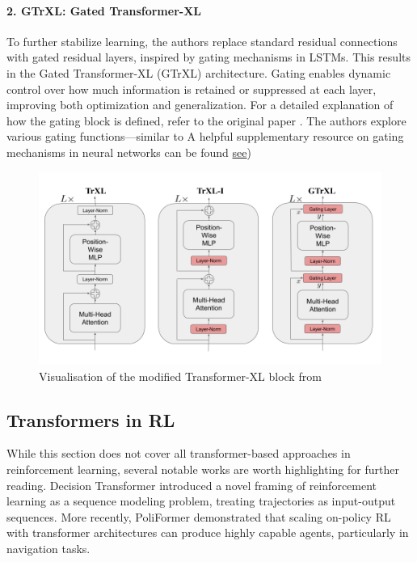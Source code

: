 \paragraph{2. GTrXL: Gated Transformer-XL} To further stabilize learning, the authors replace standard residual connections 
with gated residual layers, inspired by gating mechanisms in LSTMs. This results in the Gated Transformer-XL (GTrXL) 
architecture. Gating enables dynamic control over how much information is retained or suppressed at each layer, improving both 
optimization and generalization.\newline 
For a detailed explanation of how the gating block is defined, refer to the original paper 
\cite{parisotto2019stabilizingtransformersreinforcementlearning}. The authors explore various gating functions—similar to 
A helpful supplementary resource on gating mechanisms in neural networks can be found 
\href{https://medium.com/autonomous-agents/a-math-deep-dive-on-gating-in-neural-architectures-b49775810dde}{see})

\begin{figure}[H]
    \centering
    \includegraphics[width=0.7\linewidth]{images/gtrxl.png}
    \caption{Visualisation of the modified Transformer-XL block from \cite{parisotto2019stabilizingtransformersreinforcementlearning}}
    \label{fig:gtrxl}
\end{figure}

\subsection{Transformers in RL}
While this section does not cover all transformer-based approaches in reinforcement learning, several notable works are worth 
highlighting for further reading. Decision Transformer \cite{chen2021decisiontransformerreinforcementlearning} introduced a novel 
framing of reinforcement learning as a sequence modeling problem, treating trajectories as input-output sequences. More recently, 
PoliFormer \cite{poliformer2024} demonstrated that scaling on-policy RL with transformer architectures can produce highly capable 
agents, particularly in navigation tasks.

